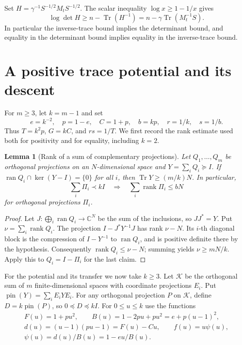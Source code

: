 \documentclass[11pt]{article}
\newtheorem{lemma}{Lemma}[section]
\newcommand{\Tr}{\operatorname{Tr}}
\newcommand{\rank}{\operatorname{rank}}
\newcommand{\ran}{\operatorname{ran}}
\newcommand{\pin}{\operatorname{pin}}
\begin{document}
Set \(H=\gamma^{-1}S^{-1/2}M_tS^{-1/2}\).
The scalar inequality \(\log x\ge1-1/x\) gives
\begin{equation}\label{eq:log}
\log\det H\ge n-\Tr(H^{-1})=n-\gamma\Tr(M_t^{-1}S).
\end{equation}
In particular the inverse-trace bound implies the determinant bound,
and equality in the determinant bound implies equality in the inverse-trace bound.

\section{A positive trace potential and its descent}\label{sec:potential}

For \(m\ge3\), let \(k=m-1\) and set
\[
e=k^{-2},\quad p=1-e,\quad C=1+p,\quad b=kp,\quad
r=1/k,\quad s=1/b.
\]
Thus \(T=k^2p\), \(G=kC\), and \(rs=1/T\). We first record the rank
estimate used both for positivity and for equality, including \(k=2\).

\begin{lemma}[Rank of a sum of complementary projections]\label{lem:rank}
Let \(Q_1,\ldots,Q_m\) be orthogonal projections on an \(N\)-dimensional
space and \(Y=\sum_iQ_i\succeq I\). If
\(\ran Q_i\cap\ker(Y-I)=\{0\}\) for all \(i\), then
\(\Tr Y\ge (m/k)N\). In particular,
\[
\sum_i\Pi_i\prec kI
\quad\Longrightarrow\quad
\sum_i\rank\Pi_i\le bN
\]
for orthogonal projections \(\Pi_i\).
\end{lemma}

\begin{proof}
Let \(J:\bigoplus_i\ran Q_i\to\mathbb C^N\) be the sum of the inclusions,
so \(JJ^*=Y\). Put \(\nu=\sum_i\rank Q_i\). The projection
\(I-J^*Y^{-1}J\) has rank \(\nu-N\).
Its \(i\)-th diagonal block is the compression of \(I-Y^{-1}\)
to \(\ran Q_i\), and is positive definite there by the hypothesis.
Consequently \(\rank Q_i\le\nu-N\); summing yields \(\nu\ge mN/k\).
Apply this to \(Q_i=I-\Pi_i\) for the last claim.
\end{proof}

For the potential and its transfer we now take \(k\ge3\).
Let \(\mathcal K\) be the orthogonal sum of \(m\) finite-dimensional
spaces with coordinate projections \(E_i\). Put
\(\pin(Y)=\sum_i E_iYE_i\). For any orthogonal projection \(P\)
on \(\mathcal K\), define \(D=k\pin(P)\), so \(0\preceq D\preceq kI\).
For \(0\le u\le k\) use the functions
\begin{equation}\label{eq:func}
\begin{gathered}
F(u)=1+pu^2,\qquad B(u)=1-2pu+pu^2=e+p(u-1)^2,\\
d(u)=(u-1)(pu-1)=F(u)-Cu,\qquad f(u)=u\psi(u),\\
\psi(u)=d(u)/B(u)=1-eu/B(u).
\end{gathered}
\end{equation}
\end{document}
